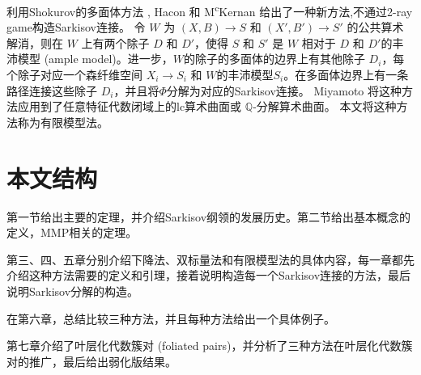 利用Shokurov的多面体方法 \cite{Sho96,cs11}, Hacon 和 M\textsuperscript{c}Kernan \cite{haconSarkisovProgram2012}给出了一种新方法,不通过2-ray game构造Sarkisov连接。
令 $W$ 为 $(X,B)\to S$ 和 $(X',B')\to S'$ 的公共算术解消，则在 $W$ 上有两个除子 $D$ 和 $D'$，使得 $S$ 和 $S'$ 是 $W$ 相对于 $D$ 和 $D'$的丰沛模型 (ample model)。进一步，$W$的除子的多面体的边界上有其他除子 $D_{i}$，每个除子对应一个森纤维空间 $X_{i}\to S_{i}$ 和 $W$的丰沛模型$S_{i}$。在多面体边界上有一条路径连接这些除子 $D_{i}$，并且将$\Phi$分解为对应的Sarkisov连接。
Miyamoto \cite{miyamoto2019TheSP} 将这种方法应用到了任意特征代数闭域上的lc算术曲面或 $\mathbb{Q}$-分解算术曲面。 本文将这种方法称为有限模型法。

\section{本文结构}
第一节给出主要的定理，并介绍Sarkisov纲领的发展历史。第二节给出基本概念的定义，MMP相关的定理。

第三、四、五章分别介绍下降法、双标量法和有限模型法的具体内容，每一章都先介绍这种方法需要的定义和引理，接着说明构造每一个Sarkisov连接的方法，最后说明Sarkisov分解的构造。

在第六章，总结比较三种方法，并且每种方法给出一个具体例子。

第七章介绍了叶层化代数簇对 (foliated pairs)，并分析了三种方法在叶层化代数簇对的推广，最后给出弱化版结果。
